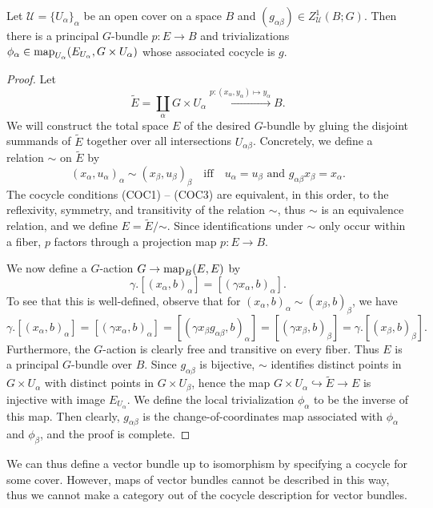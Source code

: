 \documentclass[a4paper,openany]{scrbook}
\begin{document}
\begin{prop}\label{prop:cocycleexistence}
Let $\mathcal U = \{U_\alpha\}_\alpha$ be an open cover on a space $B$ and $(g_{\alpha\beta}) \in Z^1_{\mathcal U}(B;G)$. Then there is a principal $G$-bundle $p\colon E \to B$ and trivializations $\phi_\alpha\in \operatorname{map}_{U_\alpha}(E_{U_\alpha},G \times U_{\alpha})$ whose associated cocycle is $g$.
\end{prop}
\begin{proof}
Let
\[
\tilde E = \coprod_{\alpha} G \times U_\alpha \xrightarrow{p\colon (x_\alpha,y_\alpha) \mapsto y_\alpha} B.
\]
We will construct the total space $E$ of the desired $G$-bundle by gluing the disjoint summands of $\tilde E$ together over all intersections $U_{\alpha\beta}$. Concretely, we define a relation $\sim$ on $\tilde E$ by
\[
  (x_\alpha,u_\alpha)_{\alpha} \sim (x_\beta,u_\beta)_{\beta} \quad \text{iff} \quad u_\alpha=u_\beta \text{ and } g_{\alpha\beta}x_\beta = x_\alpha.
\]
The cocycle conditions (COC1) -- (COC3) are equivalent, in this order, to the reflexivity, symmetry, and transitivity of the relation $\sim$, thus $\sim$ is an equivalence relation, and we define $E = \tilde E/\mathord{\sim}$. Since identifications under $\sim$ only occur within a fiber, $p$ factors through a projection map $p\colon E \to B$.

We now define a $G$-action $G \to \operatorname{map}_B(E,E)$ by
\[
  \gamma.[(x_\alpha,b)_{\alpha}] = [(\gamma x_\alpha,b)_{\alpha}].
\]
To see that this is well-defined, observe that for $(x_{\alpha},b)_{\alpha} \sim (x_\beta,b)_{\beta}$, we have
\[
  \gamma.[(x_\alpha,b)_{\alpha}] = [(\gamma x_\alpha,b)_{\alpha}] =[(\gamma x_\beta g_{\alpha\beta},b)_{\alpha}]=[(\gamma x_\beta,b)_{\beta}] = \gamma.[(x_\beta,b)_{\beta}].
\]
Furthermore, the $G$-action is clearly free and transitive on every fiber. Thus $E$ is a principal $G$-bundle over $B$. Since $g_{\alpha\beta}$ is bijective, $\sim$ identifies distinct points in $G \times U_\alpha$ with distinct points in $G \times U_\beta$, hence the map $G \times U_\alpha \hookrightarrow \tilde E \to E$ is injective with image $E_{U_\alpha}$. We define the local trivialization $\phi_\alpha$ to be the inverse of this map. Then clearly, $g_{\alpha\beta}$ is the change-of-coordinates map associated with $\phi_\alpha$ and $\phi_\beta$, and the proof is complete.
\end{proof}

We can thus define a vector bundle up to isomorphism by specifying a cocycle for some cover. However, maps of vector bundles cannot be described in this way, thus we cannot make a category out of the cocycle description for vector bundles. 
\end{document}
